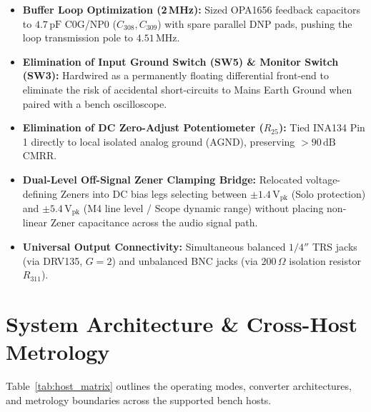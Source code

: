 \documentclass[11pt, letterpaper]{article}
\begin{document}
\begin{itemize}[leftmargin=1.5em]
    \item \textbf{Buffer Loop Optimization (2\,MHz):} Sized OPA1656 feedback capacitors to $4.7\,\text{pF}$ C0G/NP0 ($C_{308}, C_{309}$) with spare parallel DNP pads, pushing the loop transmission pole to $4.51\,\text{MHz}$.
    \item \textbf{Elimination of Input Ground Switch (SW5) \& Monitor Switch (SW3):} Hardwired as a permanently floating differential front-end to eliminate the risk of accidental short-circuits to Mains Earth Ground when paired with a bench oscilloscope.
    \item \textbf{Elimination of DC Zero-Adjust Potentiometer ($R_{25}$):} Tied INA134 Pin 1 directly to local isolated analog ground (AGND), preserving $>90\,\text{dB}$ CMRR.
    \item \textbf{Dual-Level Off-Signal Zener Clamping Bridge:} Relocated voltage-defining Zeners into DC bias legs selecting between $\pm 1.4\,\text{V}_{\text{pk}}$ (Solo protection) and $\pm 5.4\,\text{V}_{\text{pk}}$ (M4 line level / Scope dynamic range) without placing non-linear Zener capacitance across the audio signal path.
    \item \textbf{Universal Output Connectivity:} Simultaneous balanced $1/4''$ TRS jacks (via DRV135, $G=2$) and unbalanced BNC jacks (via $200\,\Omega$ isolation resistor $R_{311}$).
\end{itemize}

\section{System Architecture \& Cross-Host Metrology}

Table~\ref{tab:host_matrix} outlines the operating modes, converter architectures, and metrology boundaries across the supported bench hosts.
\end{document}
